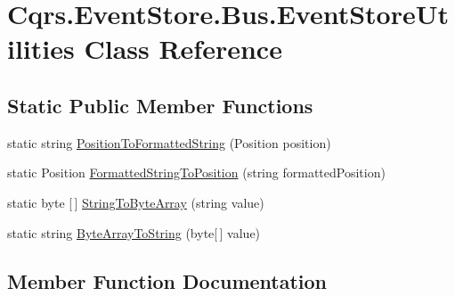 \hypertarget{classCqrs_1_1EventStore_1_1Bus_1_1EventStoreUtilities}{}\section{Cqrs.\+Event\+Store.\+Bus.\+Event\+Store\+Utilities Class Reference}
\label{classCqrs_1_1EventStore_1_1Bus_1_1EventStoreUtilities}
\subsection*{Static Public Member Functions}
\begin{DoxyCompactItemize}
\item 
static string \hyperlink{classCqrs_1_1EventStore_1_1Bus_1_1EventStoreUtilities_aba4f88ffbd314a485ced0c0528b5cd9b_aba4f88ffbd314a485ced0c0528b5cd9b}{Position\+To\+Formatted\+String} (Position position)
\item 
static Position \hyperlink{classCqrs_1_1EventStore_1_1Bus_1_1EventStoreUtilities_a69b19078c9835cb4f7c7b903fa5ca1eb_a69b19078c9835cb4f7c7b903fa5ca1eb}{Formatted\+String\+To\+Position} (string formatted\+Position)
\item 
static byte \mbox{[}$\,$\mbox{]} \hyperlink{classCqrs_1_1EventStore_1_1Bus_1_1EventStoreUtilities_a1bf8620c91556b5e0e804a2467711989_a1bf8620c91556b5e0e804a2467711989}{String\+To\+Byte\+Array} (string value)
\item 
static string \hyperlink{classCqrs_1_1EventStore_1_1Bus_1_1EventStoreUtilities_af4b4ca47a50ce0c037625c0bc8ae6d49_af4b4ca47a50ce0c037625c0bc8ae6d49}{Byte\+Array\+To\+String} (byte\mbox{[}$\,$\mbox{]} value)
\end{DoxyCompactItemize}


\subsection{Member Function Documentation}
\mbox{\label{classCqrs_1_1EventStore_1_1Bus_1_1EventStoreUtilities_af4b4ca47a50ce0c037625c0bc8ae6d49_af4b4ca47a50ce0c037625c0bc8ae6d49}} 
